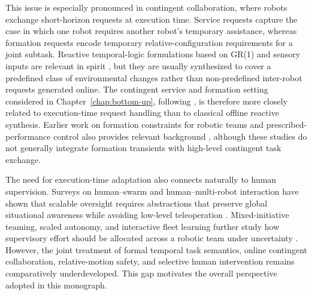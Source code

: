 This issue is especially pronounced in contingent collaboration, where robots
exchange short-horizon requests at execution time. Service requests capture the
case in which one robot requires another robot's temporary assistance, whereas
formation requests encode temporary relative-configuration requirements for a
joint subtask. Reactive temporal-logic formulations based on GR(1) and sensory
inputs are relevant in spirit \cite{kress2007s,kress2009temporal}, but they are
usually synthesized to cover a predefined class of environmental changes rather
than non-predefined inter-robot requests generated online. The contingent service
and formation setting considered in Chapter~\ref{chap:bottom-up}, following
\cite{guo2015contingent}, is therefore more closely related to execution-time
request handling than to classical offline reactive synthesis. Earlier work on
formation constraints for robotic teams and prescribed-performance control also
provides relevant background \cite{loizou2004automatic,ogren2001control,
  olfati2006flocking,bechlioulis2008robust,karayiannidis2012multi,
  bechlioulis2014robust}, although these studies do not generally integrate
formation transients with high-level contingent task exchange.

The need for execution-time adaptation also connects naturally to human
supervision. Surveys on human--swarm and human--multi-robot interaction have
shown that scalable oversight requires abstractions that preserve global
situational awareness while avoiding low-level teleoperation
\cite{kolling2016human,ferreira2021survey,dahiya2023survey}. Mixed-initiative
teaming, scaled autonomy, and interactive fleet learning further study how
supervisory effort should be allocated across a robotic team under uncertainty
\cite{gombolay2017computational,swamy2020scaledautonomy,
  hoque2022fleetdagger}. However, the joint treatment of formal temporal task
semantics, online contingent collaboration, relative-motion safety, and selective
human intervention remains comparatively underdeveloped. This gap motivates the
overall perspective adopted in this monograph.


